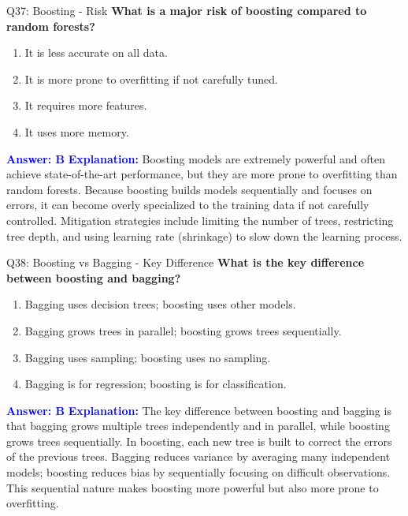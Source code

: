 \documentclass[8pt]{beamer}
\begin{document}
	\begin{frame}{Q37: Boosting - Risk}
		\fontsize{6.5}{7.5}\selectfont
		\textbf{What is a major risk of boosting compared to random forests?}
		\begin{enumerate}
			\item It is less accurate on all data.
			\item It is more prone to overfitting if not carefully tuned.
			\item It requires more features.
			\item It uses more memory.
		\end{enumerate}
		\vspace{0.1cm}
		\textcolor{blue}{\textbf{Answer: B}}
		\vspace{0.1cm}
		\textcolor{blue}{\textbf{Explanation:}} Boosting models are extremely powerful and often achieve state-of-the-art performance, but they are more prone to overfitting than random forests. Because boosting builds models sequentially and focuses on errors, it can become overly specialized to the training data if not carefully controlled. Mitigation strategies include limiting the number of trees, restricting tree depth, and using learning rate (shrinkage) to slow down the learning process.
	\end{frame}
	
	\begin{frame}{Q38: Boosting vs Bagging - Key Difference}
		\fontsize{6.5}{7.5}\selectfont
		\textbf{What is the key difference between boosting and bagging?}
		\begin{enumerate}
			\item Bagging uses decision trees; boosting uses other models.
			\item Bagging grows trees in parallel; boosting grows trees sequentially.
			\item Bagging uses sampling; boosting uses no sampling.
			\item Bagging is for regression; boosting is for classification.
		\end{enumerate}
		\vspace{0.1cm}
		\textcolor{blue}{\textbf{Answer: B}}
		\vspace{0.1cm}
		\textcolor{blue}{\textbf{Explanation:}} The key difference between boosting and bagging is that bagging grows multiple trees independently and in parallel, while boosting grows trees sequentially. In boosting, each new tree is built to correct the errors of the previous trees. Bagging reduces variance by averaging many independent models; boosting reduces bias by sequentially focusing on difficult observations. This sequential nature makes boosting more powerful but also more prone to overfitting.
	\end{frame}
	
\end{document}
